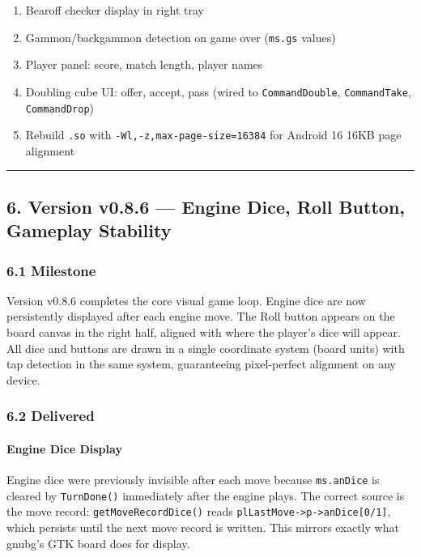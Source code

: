\documentclass[11pt,a4paper]{article}
\providecommand{\tightlist}{\setlength{\itemsep}{2pt}\setlength{\parskip}{0pt}}
\begin{document}
\begin{enumerate}
\def\labelenumi{\arabic{enumi}.}
\tightlist
\item
  Bearoff checker display in right tray
\item
  Gammon/backgammon detection on game over (\texttt{ms.gs} values)
\item
  Player panel: score, match length, player names
\item
  Doubling cube UI: offer, accept, pass (wired to \texttt{CommandDouble},
  \texttt{CommandTake}, \texttt{CommandDrop})
\item
  Rebuild \texttt{.so} with \texttt{-Wl,-z,max-page-size=16384} for
  Android 16 16KB page alignment
\end{enumerate}

\begin{center}\rule{0.5\linewidth}{0.5pt}\end{center}


\subsection{6. Version v0.8.6 --- Engine Dice, Roll Button, Gameplay Stability}\label{version-v086}

\subsubsection{6.1 Milestone}\label{milestone-v086}

Version v0.8.6 completes the core visual game loop. Engine dice are now
persistently displayed after each engine move. The Roll button appears on
the board canvas in the right half, aligned with where the player's dice
will appear. All dice and buttons are drawn in a single coordinate system
(board units) with tap detection in the same system, guaranteeing
pixel-perfect alignment on any device.

\subsubsection{6.2 Delivered}\label{delivered-v086}

\paragraph{Engine Dice Display}

Engine dice were previously invisible after each move because
\texttt{ms.anDice} is cleared by \texttt{TurnDone()} immediately after
the engine plays. The correct source is the move record:
\texttt{getMoveRecordDice()} reads \texttt{plLastMove->p->anDice[0/1]},
which persists until the next move record is written. This mirrors
exactly what gnubg's GTK board does for display.
\end{document}
